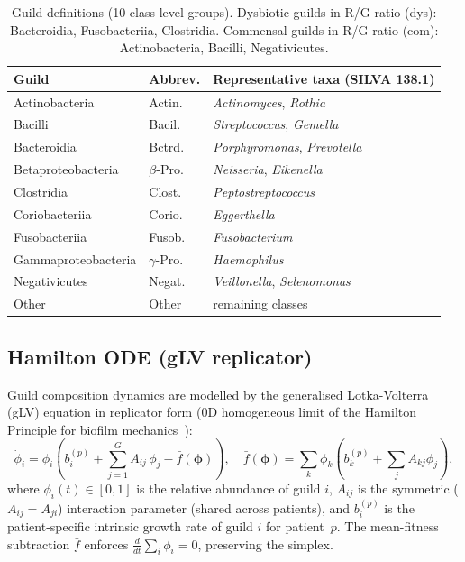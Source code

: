 \documentclass[11pt,a4paper]{article}
\newcommand{\bphi}{\boldsymbol{\phi}}
\begin{document}
\begin{table}[htb]
\centering
\caption{Guild definitions (10 class-level groups).
         Dysbiotic guilds in R/G ratio (dys): Bacteroidia, Fusobacteriia, Clostridia.
         Commensal guilds in R/G ratio (com): Actinobacteria, Bacilli, Negativicutes.}
\label{tab:guilds}
\small
\begin{tabular}{llp{6cm}}
\toprule
\textbf{Guild} & \textbf{Abbrev.} & \textbf{Representative taxa (SILVA 138.1)} \\
\midrule
Actinobacteria       & Actin. & \textit{Actinomyces}, \textit{Rothia} \\
Bacilli              & Bacil. & \textit{Streptococcus}, \textit{Gemella} \\
Bacteroidia          & Bctrd. & \textit{Porphyromonas}, \textit{Prevotella} \\
Betaproteobacteria   & $\beta$-Pro. & \textit{Neisseria}, \textit{Eikenella} \\
Clostridia           & Clost. & \textit{Peptostreptococcus} \\
Coriobacteriia       & Corio. & \textit{Eggerthella} \\
Fusobacteriia        & Fusob. & \textit{Fusobacterium} \\
Gammaproteobacteria  & $\gamma$-Pro. & \textit{Haemophilus} \\
Negativicutes        & Negat. & \textit{Veillonella}, \textit{Selenomonas} \\
Other                & Other & remaining classes \\
\bottomrule
\end{tabular}
\end{table}

\subsection{Hamilton ODE (gLV replicator)}
\label{ssec:model}

Guild composition dynamics are modelled by the generalised Lotka-Volterra
(gLV) equation in replicator form (0D homogeneous limit of the Hamilton
Principle for biofilm mechanics~\citep{junker2021,klempt2024}):
\begin{equation}
  \dot{\phi}_i = \phi_i \!\left( b_i^{(p)} + \sum_{j=1}^{G} A_{ij}\,\phi_j
                  - \bar{f}(\bphi) \right),
  \quad
  \bar{f}(\bphi) = \sum_{k} \phi_k \!\left(b_k^{(p)} + \sum_j A_{kj}\phi_j\right),
  \label{eq:glv}
\end{equation}
where $\phi_i(t)\in[0,1]$ is the relative abundance of guild $i$,
$A_{ij}$ is the symmetric ($A_{ij}=A_{ji}$) interaction parameter (shared
across patients), and $b_i^{(p)}$ is the patient-specific intrinsic growth
rate of guild $i$ for patient~$p$.
The mean-fitness subtraction $\bar{f}$ enforces $\frac{d}{dt}\sum_i\phi_i=0$,
preserving the simplex.
\end{document}
